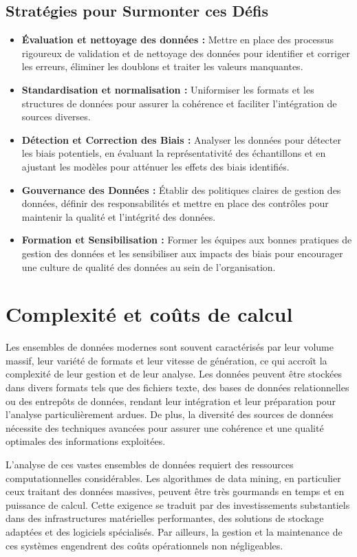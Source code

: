 \documentclass[a4paper,12pt]{report}
\begin{document}
		\subsection{Stratégies pour Surmonter ces Défis}
			\begin{itemize}
				\item \textbf{Évaluation et nettoyage des données :} Mettre en place des processus rigoureux de validation et de nettoyage des données pour identifier et corriger les erreurs, éliminer les doublons et traiter les valeurs manquantes. 
				\item \textbf{Standardisation et normalisation :} Uniformiser les formats et les structures de données pour assurer la cohérence et faciliter l'intégration de sources diverses. 
				\item \textbf{Détection et Correction des Biais :} Analyser les données pour détecter les biais potentiels, en évaluant la représentativité des échantillons et en ajustant les modèles pour atténuer les effets des biais identifiés. 
				\item \textbf{Gouvernance des Données :} Établir des politiques claires de gestion des données, définir des responsabilités et mettre en place des contrôles pour maintenir la qualité et l'intégrité des données. 
				\item \textbf{Formation et Sensibilisation :} Former les équipes aux bonnes pratiques de gestion des données et les sensibiliser aux impacts des biais pour encourager une culture de qualité des données au sein de l'organisation.
			\end{itemize}

	\section{Complexité et coûts de calcul}
		Les ensembles de données modernes sont souvent caractérisés par leur volume massif, leur variété de formats et leur vitesse de génération, ce qui accroît la complexité de leur gestion et de leur analyse. Les données peuvent être stockées dans divers formats tels que des fichiers texte, des bases de données relationnelles ou des entrepôts de données, rendant leur intégration et leur préparation pour l'analyse particulièrement ardues. De plus, la diversité des sources de données nécessite des techniques avancées pour assurer une cohérence et une qualité optimales des informations exploitées.

		L'analyse de ces vastes ensembles de données requiert des ressources computationnelles considérables. Les algorithmes de data mining, en particulier ceux traitant des données massives, peuvent être très gourmands en temps et en puissance de calcul. Cette exigence se traduit par des investissements substantiels dans des infrastructures matérielles performantes, des solutions de stockage adaptées et des logiciels spécialisés. Par ailleurs, la gestion et la maintenance de ces systèmes engendrent des coûts opérationnels non négligeables.
\end{document}
